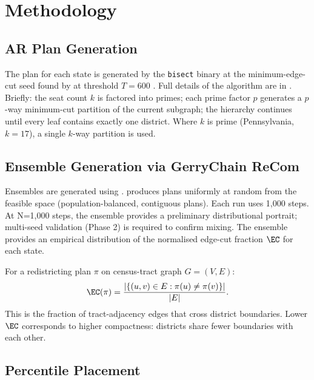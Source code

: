 \section{Methodology}
\label{sec:method}

\subsection{AR Plan Generation}

The \ar{} plan for each state is generated by the \texttt{bisect} binary
at the minimum-edge-cut seed found by \cs{} at threshold $T = 600$
\citep{dellaLibera2026b16}.  Full details of the algorithm are in
\citet{dellaLibera2026b11}.  Briefly: the seat count $k$ is factored into
primes; each prime factor $p$ generates a $p$-way minimum-cut partition of
the current subgraph; the hierarchy continues until every leaf contains
exactly one district.  Where $k$ is prime (Pennsylvania, $k = 17$), a
single $k$-way partition is used.

\subsection{Ensemble Generation via GerryChain ReCom}

Ensembles are generated using \gc{} \recom{} \citep{deford2021recombination}.
\recom{} produces plans uniformly at random from the feasible space
(population-balanced, contiguous plans).  Each run uses 1,000 steps.
At N=1,000 steps, the ensemble provides a preliminary distributional portrait;
multi-seed validation (Phase 2) is required to confirm mixing.
The ensemble provides an empirical distribution of the normalised edge-cut
fraction $\EC$ for each state.

\begin{definition}
For a redistricting plan $\pi$ on census-tract graph $G = (V, E)$:
\begin{equation}
  \EC(\pi) = \frac{|\{(u,v) \in E : \pi(u) \neq \pi(v)\}|}{|E|}.
\end{equation}
This is the fraction of tract-adjacency edges that cross district boundaries.
Lower $\EC$ corresponds to higher compactness: districts share fewer boundaries
with each other.
\end{definition}

\subsection{Percentile Placement}

